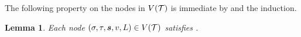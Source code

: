\documentclass[11pt]{article}
\newtheorem{lemma}[theorem]{Lemma}
\newcommand{\set}[1]{\left\{#1\right\}}
\def\!#1{\mathtt{#1}}
\newcommand{\seqS}{\boldsymbol{s}}
\renewcommand{\Pr}[2][]{ \ifthenelse{\isempty{#1}}
  {\mathbf{Pr}\left[#2\right]} {\mathbf{Pr}_{#1}\left[#2\right]} }
\newcommand{\qgl}[1]{{\color{purple}{#1}}}
\begin{document}


The following property on the nodes in $V(\mathcal{T})$ is immediate by  and the induction.
\begin{lemma}\label{lemma-property-tct-vl}
Each node $(\sigma, \tau, \seqS, v, L)\in V(\+T)$ satisfies .
\end{lemma}


\end{document}
